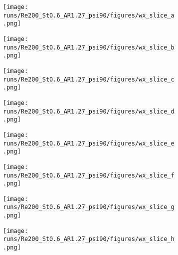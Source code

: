\begin{figure}
  \centering
  \begin{subfigure}[t]{0.24\textwidth}
    \centering
    \texttt{[image: runs/Re200\_St0.6\_AR1.27\_psi90/figures/wx\_slice\_a.png]}
    \caption{}
    \label{fig:baseline_wx_slices:a}
  \end{subfigure}
  \begin{subfigure}[t]{0.24\textwidth}
    \centering
    \texttt{[image: runs/Re200\_St0.6\_AR1.27\_psi90/figures/wx\_slice\_b.png]}
    \caption{}
    \label{fig:baseline_wx_slices:b}
  \end{subfigure}
  \begin{subfigure}[t]{0.24\textwidth}
    \centering
    \texttt{[image: runs/Re200\_St0.6\_AR1.27\_psi90/figures/wx\_slice\_c.png]}
    \caption{}
    \label{fig:baseline_wx_slices:c}
  \end{subfigure}
  \begin{subfigure}[t]{0.24\textwidth}
    \centering
    \texttt{[image: runs/Re200\_St0.6\_AR1.27\_psi90/figures/wx\_slice\_d.png]}
    \caption{}
    \label{fig:baseline_wx_slices:d}
  \end{subfigure}
  \vspace{0.5cm}
  \begin{subfigure}[t]{0.24\textwidth}
    \centering
    \texttt{[image: runs/Re200\_St0.6\_AR1.27\_psi90/figures/wx\_slice\_e.png]}
    \caption{}
    \label{fig:baseline_wx_slices:e}
  \end{subfigure}
  \begin{subfigure}[t]{0.24\textwidth}
    \centering
    \texttt{[image: runs/Re200\_St0.6\_AR1.27\_psi90/figures/wx\_slice\_f.png]}
    \caption{}
    \label{fig:baseline_wx_slices:f}
  \end{subfigure}
  \begin{subfigure}[t]{0.24\textwidth}
    \centering
    \texttt{[image: runs/Re200\_St0.6\_AR1.27\_psi90/figures/wx\_slice\_g.png]}
    \caption{}
    \label{fig:baseline_wx_slices:g}
  \end{subfigure}
  \begin{subfigure}[t]{0.24\textwidth}
    \centering
    \texttt{[image: runs/Re200\_St0.6\_AR1.27\_psi90/figures/wx\_slice\_h.png]}
    \caption{}
    \label{fig:baseline_wx_slices:h}
  \end{subfigure}
  \vspace{0.5cm}
  \begin{subfigure}[t]{0.24\textwidth}

\end{subfigure}
\end{figure}
